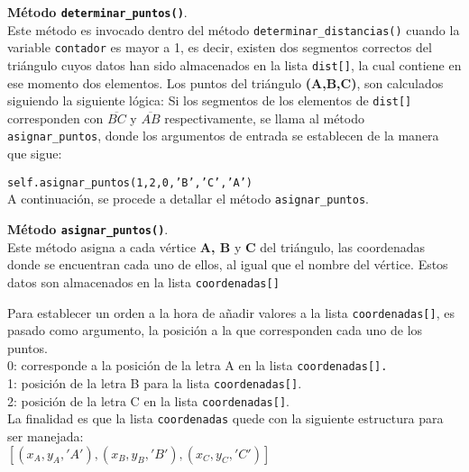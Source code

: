 \textbf{Método \texttt{determinar\_puntos()}}.\\
Este método es invocado dentro del método \texttt{determinar\_distancias()} cuando la variable \texttt{contador} es mayor a 1, es decir, existen dos segmentos correctos del triángulo cuyos datos han sido almacenados en la lista \texttt{dist[]}, la cual contiene en ese momento dos elementos.
Los puntos del triángulo \textbf{(A,B,C)}, son calculados siguiendo la siguiente lógica:
Si los segmentos de los elementos de \texttt{dist[]} corresponden con $\overline{BC}$ y $\overline{AB}$ respectivamente, se llama al método \texttt{asignar\_puntos}, donde los argumentos de entrada se establecen de la manera que sigue:

\texttt{self.asignar\_puntos(1,2,0,'B','C','A')}\\

A continuación, se procede a detallar el método \texttt{asignar\_puntos}.

\textbf{Método \texttt{asignar\_puntos()}}.\\
Este método asigna a cada vértice \textbf{A, B} y \textbf{C} del triángulo, las coordenadas donde se encuentran cada uno de ellos, al igual que el nombre del vértice. Estos datos son almacenados en la lista \texttt{coordenadas[]}

Para establecer un orden a la hora de añadir valores a la lista \texttt{coordenadas[]}, es pasado como argumento, la posición a la que corresponden cada uno de los puntos.\\
0: corresponde a la posición de la letra A en la lista \texttt{coordenadas[].}\\
1: posición de la letra B para la lista \texttt{coordenadas[]}.\\
2: posición de la letra C en la lista \texttt{coordenadas[]}.\\

La finalidad es que la lista \texttt{coordenadas} quede con la siguiente estructura para ser manejada:\\

$[(x_{A},y_{A},'A'),(x_{B},y_{B},'B'),(x_{C},y_{C},'C')]$\\


